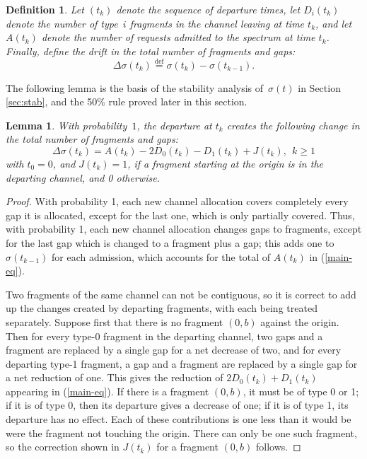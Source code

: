 \documentclass{amsart}
\newtheorem{defi}{Definition}
\newtheorem{lemma}{Lemma}
\begin{document}
\begin{defi}
Let $(t_k)$ denote the sequence of departure times, let $D_i(t_k)$
denote the number of type~$i$ fragments in the channel leaving at
time $t_k$, and let $A(t_k)$ denote the number of requests admitted
to the spectrum at time $t_k$.  Finally, define the {\em
drift} in the total number of fragments and gaps:
\begin{equation}
\label{fragplusgap} \Delta \sigma(t_k) \stackrel{\text{def}}{=}
\sigma(t_k) - \sigma(t_{k-1}).
\end{equation}
\end{defi}
The following lemma is the basis of the stability analysis
of~$\sigma(t)$ in Section \ref{sec:stab}, and the 50\% rule proved later in
this section.
\begin{lemma}
\label{main} With probability~$1$, the departure at $t_k$ creates the
following change in the total number of fragments and gaps:
\begin{equation} \label{main-eq}
\Delta \sigma (t_k)   = A(t_k) - 2D_0(t_k) - D_1(t_k) + J(t_k), ~~k
\geq 1
\end{equation}
with $t_0=0$, and  $J(t_k) = 1$, if a fragment starting at the origin is
in the departing channel, and 0 otherwise.
\end{lemma}
\begin{proof}
With probability 1, each new channel allocation covers completely
every gap it is allocated, except for the last one, which is only
partially covered. Thus, with probability 1, each new channel
allocation changes gaps to fragments, except for the last gap which
is changed to a fragment plus a gap; this adds one to
$\sigma(t_{k-1})$ for each admission,
which accounts for the total of $A(t_k)$ in (\ref{main-eq}).

Two fragments of the same channel can not be contiguous, so it is
correct to add up the changes created by departing fragments, with
each being treated separately.  Suppose first that there is no
fragment $(0,b)$ against the origin. Then for every type-0 fragment in
the departing channel, two gaps and a fragment are replaced by a
single gap for a net decrease of two, and for every departing type-1
fragment, a gap and a fragment are replaced by a single gap for a
net reduction of one. This gives the reduction of $2D_0(t_k)+
D_1(t_k)$ appearing in (\ref{main-eq}).  If there is a fragment
$(0,b)$, it must be of type 0 or 1; if it is of type 0, then its
departure gives a decrease of one; if it is of type 1, its departure
has no effect.  Each of these contributions is one less than it
would be were the fragment not touching the origin.  There can only
be one such fragment, so the correction shown in $J(t_k)$ for a
fragment $(0,b)$ follows.
\end{proof}
\end{document}
